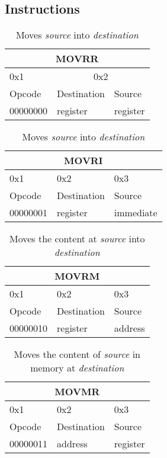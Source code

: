 \documentclass{article}
\begin{document}
\subsection{Instructions}
\begin{table}[h!]
  \centering
  \begin{tabular} { | p{2cm} | | p{2cm} | p{2cm} |}
    \hline
    \multicolumn{3}{|c|}{MOVRR}\\
    \hline
    0x1 & \multicolumn{2}{|c|}{0x2}\\
    \hline
    Opcode & Destination & Source\\
    00000000 & register & register\\
    \hline
  \end{tabular}
  \caption{Moves \textit{source} into \textit{destination}}
\end{table}

\begin{table}[h!]
  \centering
  \begin{tabular} { | p{2cm} | | p{2cm} | p{2cm} |}
    \hline
    \multicolumn{3}{|c|}{MOVRI}\\
    \hline
    0x1 & 0x2 & 0x3\\
    \hline
    Opcode & Destination & Source\\
    00000001 & register & immediate\\
    \hline
  \end{tabular}
  \caption{Moves \textit{source} into \textit{destination}}
\end{table}

\begin{table}[h!]
  \centering
  \begin{tabular} { | p{2cm} | | p{2cm} | p{2cm} |}
    \hline
    \multicolumn{3}{|c|}{MOVRM}\\
    \hline
    0x1 & 0x2 & 0x3\\
    \hline
    Opcode & Destination & Source\\
    00000010 & register & address\\
    \hline
  \end{tabular}
  \caption{Moves the content at \textit{source} into \textit{destination}}
\end{table}

\begin{table}[h!]
  \centering
  \begin{tabular} { | p{2cm} | | p{2cm} | p{2cm} |}
    \hline
    \multicolumn{3}{|c|}{MOVMR}\\
    \hline
    0x1 & 0x2 & 0x3\\
    \hline
    Opcode & Destination & Source\\
    00000011 & address & register\\
    \hline
  \end{tabular}
  \caption{Moves the content of \textit{source} in memory at \textit{destination}}
\end{table}
\end{document}
